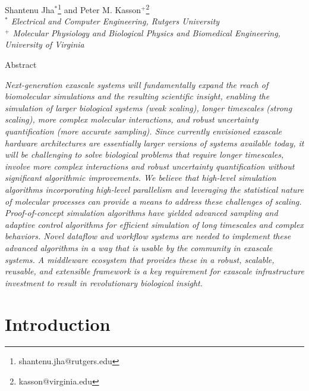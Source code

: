 \documentclass[10pt,letterpaper,draft]{article}
\begin{document}
\thispagestyle{empty}
\begin{center} 

\vspace{0.25in}
\large Shantenu Jha$^{*}$\footnote{shantenu.jha@rutgers.edu} and Peter M. Kasson$^{+}$\footnote{kasson@virginia.edu}\\

\small {\it $^*$ Electrical and Computer Engineering, Rutgers University} \\
\small {\it $^+$ Molecular Physiology and Biological Physics and Biomedical
  Engineering, University of Virginia} \\

\vspace{0.25in}

\large Abstract

\end{center} {\it Next-generation exascale systems will fundamentally expand the
  reach of biomolecular simulations and the resulting scientific insight,
  enabling the simulation of larger biological systems (weak scaling), longer
  timescales (strong scaling), more complex molecular interactions, and robust
  uncertainty quantification (more accurate sampling).  Since currently
  envisioned exascale hardware architectures are essentially larger versions of
  systems available today, it will be challenging to solve biological problems
  that require longer timescales, involve more complex interactions and robust
  uncertainty quantification without significant algorithmic improvements.  We
  believe that high-level simulation algorithms incorporating high-level
  parallelism and leveraging the statistical nature of molecular processes can
  provide a means to address these challenges of scaling.  Proof-of-concept
  simulation algorithms have yielded advanced sampling and adaptive control
  algorithms for efficient simulation of long timescales and complex
  behaviors. Novel dataflow and workflow systems are needed to
  implement these advanced algorithms in a way that is usable by the community
  in exascale systems. A middleware ecosystem that provides these in a robust,
  scalable, reusable, and extensible framework is a key requirement for exascale
  infrastructure investment to result in revolutionary biological insight.  }

\vspace{0.15in}

\section*{Introduction}
\end{document}

